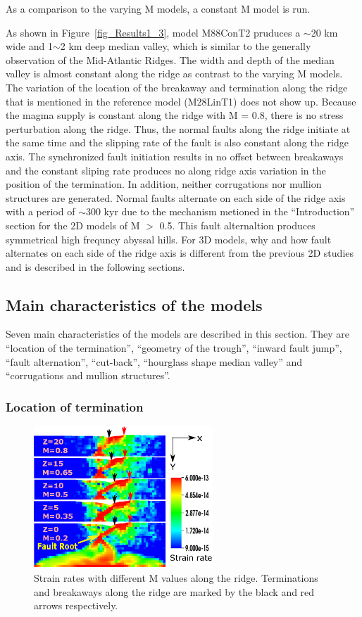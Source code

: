 As a comparison to the varying M models, a constant M model is run. 

As shown in Figure~\hyperref[fig_Results1_3]{\ref{fig_Results1_3}}, model M88ConT2 pruduces a $\sim$20 km wide and 1$\sim$2 km deep median valley, which is similar to the generally observation of the Mid-Atlantic Ridges. The width and depth of the median valley is almost constant along the ridge as contrast to the varying M models. The variation of the location of the breakaway and termination along the ridge that is mentioned in the reference model (M28LinT1) does not show up. Because the magma supply is constant along the ridge with M = 0.8, there is no stress perturbation along the ridge. Thus, the normal faults along the ridge initiate at the same time and the slipping rate of the fault is also constant along the ridge axis. The synchronized fault initiation results in no offset between breakaways and the constant sliping rate produces no along ridge axis variation in the position of the termination. In addition, neither corrugations nor mullion structures are generated. Normal faults alternate on each side of the ridge axis with a period of $\sim$300 kyr due to the mechanism metioned in the ``Introduction'' section for the 2D models of M $>$ 0.5. This fault alternaltion produces symmetrical high frequncy abyssal hills. For 3D models, why and how fault alternates on each side of the ridge axis is different from the previous 2D studies and is described in the following sections. 

\subsection{Main characteristics of the models}
Seven main characteristics of the models are described in this section. They are ``location of the termination'', ``geometry of the trough'', ``inward fault jump'', ``fault alternation'', ``cut-back'', ``hourglass shape median valley'' and ``corrugations and mullion structures''.

\subsubsection{Location of termination}

\begin{figure}[h]
  \centering
    \includegraphics[width=0.6\textwidth]{./Figures/fig_Results1_2.eps}
  \caption{Strain rates with different M values along the ridge. Terminations and breakaways along the ridge are marked by the black and red arrows respectively. }
 \label{fig_Results1_2}
\end{figure}   

